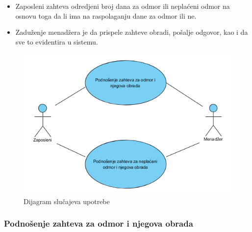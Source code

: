  \begin{itemize}
     \item Zaposleni zahteva odredjeni broj dana za odmor ili nepla\' ceni odmor na osnovu toga da li ima na raspolaganju dane za odmor ili ne.
     \item Zadu\v zenje menad\v zera je da prispele zahteve obradi, po\v salje odgovor, kao i da sve to evidentira u sistemu.
 \end{itemize}
 \begin{figure}[!h]
    \includegraphics[width=1\textwidth]{slike/Upravljanje_osobljem.png}
    \caption{Dijagram slu\v cajeva upotrebe} %
    \label{fig:slika7}
\end{figure}

  \subsubsection{Podno\v senje zahteva za odmor i njegova obrada }
   
